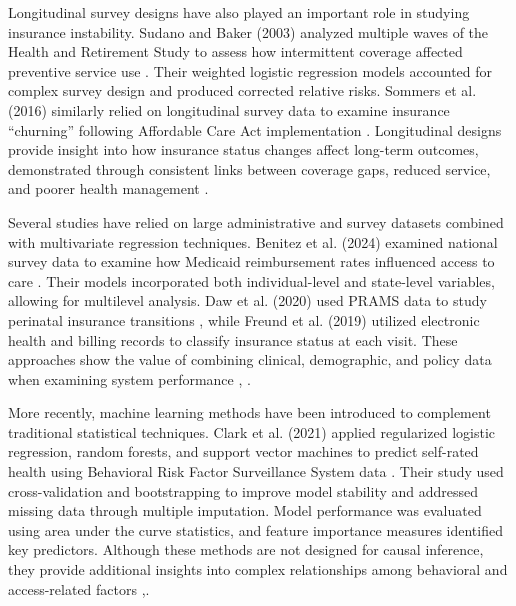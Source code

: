 Longitudinal survey designs have also played an important role in studying insurance instability. Sudano and Baker (2003) analyzed multiple waves of the Health and Retirement Study to assess how intermittent coverage affected preventive service use \cite{Sudano_Baker_2003}. Their weighted logistic regression models accounted for complex survey design and produced corrected relative risks. Sommers et al. (2016) similarly relied on longitudinal survey data to examine insurance “churning” following Affordable Care Act implementation \cite{Sommers_Blendon_Orav_Epstein_2016}. Longitudinal designs provide insight into how insurance status changes affect long-term outcomes, demonstrated through consistent links between coverage gaps, reduced service, and poorer health management \cite{Rogers_Lee_Tipirneni_Banerjee_Kim_2018}.

Several studies have relied on large administrative and survey datasets combined with multivariate regression techniques. Benitez et al. (2024) examined national survey data to examine how Medicaid reimbursement rates influenced access to care \cite{Benitez_Freed_Huang_Oladele_2024}. Their models incorporated both individual-level and state-level variables, allowing for multilevel analysis. Daw et al. (2020) used PRAMS data to study perinatal insurance transitions \cite{Daw_Winkelman_Dalton_Kozhimannil_Admon_2020}, while Freund et al. (2019) utilized electronic health and billing records to classify insurance status at each visit. These approaches show the value of combining clinical, demographic, and policy data when examining system performance \cite{Allen_Gordon_Lee_Bhanja_Sommers_2021}, \cite{Benitez_Freed_Huang_Oladele_2024}.

More recently, machine learning methods have been introduced to complement traditional statistical techniques. Clark et al. (2021) applied regularized logistic regression, random forests, and support vector machines to predict self-rated health using Behavioral Risk Factor Surveillance System data \cite{Clark_Ommerborn_Moran_Brooks_Haas_Bates_Wright_2021}. Their study used cross-validation and bootstrapping to improve model stability and addressed missing data through multiple imputation. Model performance was evaluated using area under the curve statistics, and feature importance measures identified key predictors. Although these methods are not designed for causal inference, they provide additional insights into complex relationships among behavioral and access-related factors \cite{Clark_Ommerborn_Moran_Brooks_Haas_Bates_Wright_2021},\cite{BRFSS2024}.

